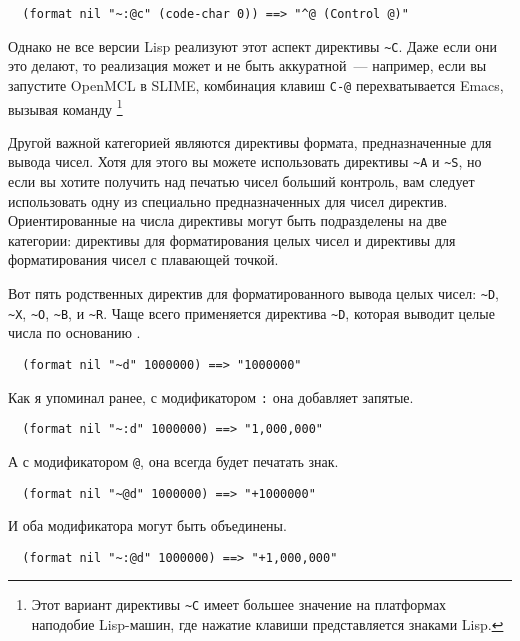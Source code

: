 {\begin{verbatim}
  (format nil "~:@c" (code-char 0)) ==> "^@ (Control @)"
\end{verbatim}

Однако не все версии Lisp реализуют этот аспект директивы \lstinline!~C!. Даже если они
это делают, то реализация может и не быть аккуратной~--- например, если вы запустите OpenMCL
в SLIME, комбинация клавиш \lstinline!C-@! перехватывается Emacs, вызывая команду
\footnote{Этот вариант директивы \lstinline!~C! имеет большее
  значение на платформах наподобие Lisp-машин, где нажатие клавиши представляется знаками
  Lisp.}
	
Другой важной категорией являются директивы формата, предназначенные для вывода
чисел. Хотя для этого вы можете использовать директивы \lstinline!~A! и \lstinline!~S!, но
если вы хотите получить над печатью чисел больший контроль, вам следует использовать одну
из специально предназначенных для чисел директив. Ориентированные на числа директивы могут
быть подразделены на две категории: директивы для форматирования целых чисел и директивы
для форматирования чисел с плавающей точкой.

Вот пять родственных директив для форматированного вывода целых чисел: \lstinline!~D!,
\lstinline!~X!, \lstinline!~O!, \lstinline!~B!, и \lstinline!~R!. Чаще всего применяется
директива \lstinline!~D!, которая выводит целые числа по основанию .

\begin{verbatim}
  (format nil "~d" 1000000) ==> "1000000"
\end{verbatim}

Как я упоминал ранее, с модификатором \lstinline!:! она добавляет запятые.

\begin{verbatim}
  (format nil "~:d" 1000000) ==> "1,000,000"
\end{verbatim}

А с модификатором \lstinline!@!, она всегда будет печатать знак.

\begin{verbatim}
  (format nil "~@d" 1000000) ==> "+1000000"
\end{verbatim}

И оба модификатора могут быть объединены.

\begin{verbatim}
  (format nil "~:@d" 1000000) ==> "+1,000,000"
\end{verbatim}

}
